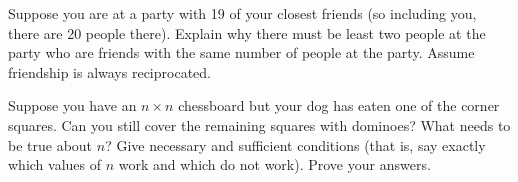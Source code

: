 \begin{questions}
\question Suppose you are at a party with 19 of your closest friends (so including you, there are 20 people there).  Explain why there must be least two people at the party who are friends with the same number of people at the party.  Assume friendship is always reciprocated.

%  


\question Suppose you have an $n\times n$ chessboard but your dog has eaten one of the corner squares. Can you still cover the remaining squares with dominoes? What needs to be true about $n$? Give necessary and sufficient conditions (that is, say exactly which values of $n$ work and which do not work). Prove your answers.

\begin{center}
\end{center}


\end{questions}
